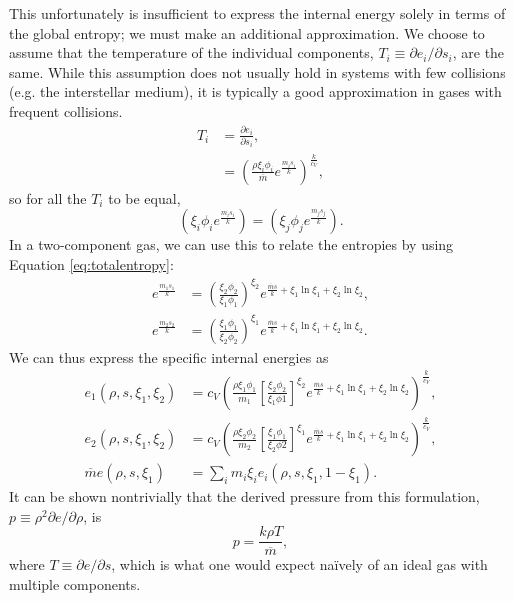 This unfortunately is insufficient to express the internal energy solely in terms of the global entropy; we must make an additional approximation.
We choose to assume that the temperature of the individual components, $T_{i}\equiv\partial e_{i}/\partial s_{i}$, are the same.
While this assumption does not usually hold in systems with few collisions (e.g. the interstellar medium), it is typically a good approximation in gases with frequent collisions.
\begin{align}
	T_{i}&=\frac{\partial e_{i}}{\partial s_{i}},\\
	&=\left(\frac{\rho\xi_{i}\phi_{i}}{\overline{m}}e^{\frac{m_{i}s_{i}}{k}}\right)^{\frac{k}{c_{V}}},
\end{align} 
so for all the $T_{i}$ to be equal,
\begin{equation}
	\left(\xi_{i}\phi_{i}e^{\frac{m_{i}s_{i}}{k}}\right)=\left(\xi_{j}\phi_{j}e^{\frac{m_{j}s_{j}}{k}}\right).
\end{equation}
In a two-component gas, we can use this to relate the entropies by using Equation \ref{eq:totalentropy}:
\begin{align}
	e^{\frac{m_{1}s_{1}}{k}}&=\left(\frac{\xi_{2}\phi_{2}}{\xi_{1}\phi_{1}}\right)^{\xi_{2}}e^{\frac{\overline{m}s}{k}+\xi_{1}\ln{\xi_{1}}+\xi_{2}\ln{\xi_{2}}},\\
	e^{\frac{m_{2}s_{2}}{k}}&=\left(\frac{\xi_{1}\phi_{1}}{\xi_{2}\phi_{2}}\right)^{\xi_{1}}e^{\frac{\overline{m}s}{k}+\xi_{1}\ln{\xi_{1}}+\xi_{2}\ln{\xi_{2}}}.
\end{align}
We can thus express the specific internal energies as
\begin{align}
	e_{1}\left(\rho,s,\xi_{1},\xi_{2}\right)&=c_{V}\left(\frac{\rho\xi_{1}\phi_{1}}{m_{1}}\left[\frac{\xi_{2}\phi_{2}}{\xi_{1}\phi{1}}\right]^{\xi_{2}} e^{\frac{\overline{m}s}{k}+\xi_{1}\ln{\xi_{1}}+\xi_{2}\ln{\xi_{2}}}\right)^{\frac{k}{c_{V}}},\\
	e_{2}\left(\rho,s,\xi_{1},\xi_{2}\right)&=c_{V}\left(\frac{\rho\xi_{2}\phi_{2}}{m_{2}}\left[\frac{\xi_{1}\phi_{1}}{\xi_{2}\phi{2}}\right]^{\xi_{1}} e^{\frac{\overline{m}s}{k}+\xi_{1}\ln{\xi_{1}}+\xi_{2}\ln{\xi_{2}}}\right)^{\frac{k}{c_{V}}},\\
	\overline{m} e\left(\rho,s,\xi_{1}\right)&=\sum_{i} m_{i} \xi_{i} e_{i}\left(\rho,s,\xi_{1},1-\xi_{1}\right).
\end{align}
It can be shown nontrivially that the derived pressure from this formulation, $p\equiv\rho^{2}\partial e /\partial \rho$, is
\begin{equation}
	p=\frac{k\rho T}{\overline{m}},
\end{equation}
where $T\equiv\partial e/\partial s$, which is what one would expect na\"ively of an ideal gas with multiple components.

